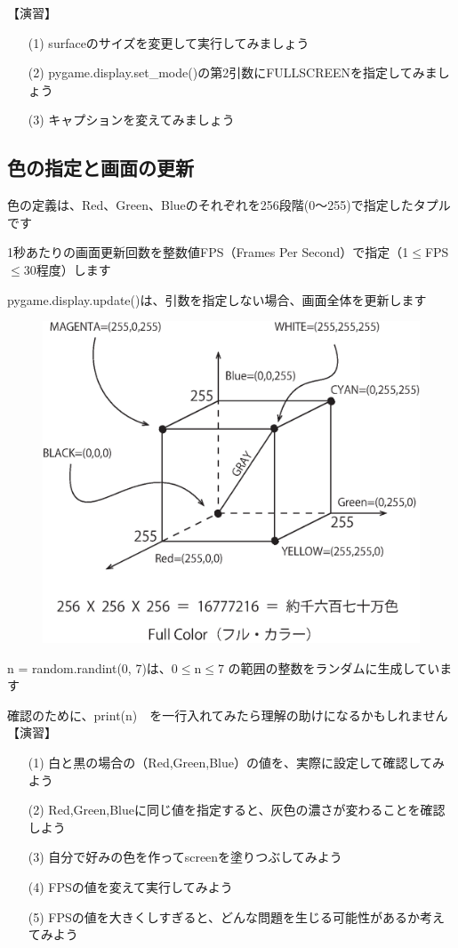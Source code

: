 \documentclass[uplatex,a4paper,11pt,oneside,openany]{jsbook}
\begin{document}

【演習】
\begin{enumerate}
\item[(1)] surfaceのサイズを変更して実行してみましょう
\item[(2)] pygame.display.set\_mode()の第2引数にFULLSCREENを指定してみましょう
\item[(3)] キャプションを変えてみましょう
\end{enumerate}

\newpage

\subsection{色の指定と画面の更新}

色の定義は、Red、Green、Blueのそれぞれを256段階(0〜255)で指定したタプルです

1秒あたりの画面更新回数を整数値FPS（Frames Per Second）で指定（1$\le$FPS$\le$30程度）します

pygame.display.update()は、引数を指定しない場合、画面全体を更新します



\begin{figure}[h]
\vspace*{-11cm}
\hspace*{7.5cm}
\includegraphics[width=0.5\hsize]{figures/eps/pg02.eps}
\label{ラベル2}
\end{figure}

\vspace{4cm}

n = random.randint(0, 7)は、0$\le$n$\le$7 の範囲の整数をランダムに生成しています

確認のために、print(n)　を一行入れてみたら理解の助けになるかもしれません\\

【演習】
\begin{enumerate}
\item[(1)] 白と黒の場合の（Red,Green,Blue）の値を、実際に設定して確認してみよう
\item[(2)] Red,Green,Blueに同じ値を指定すると、灰色の濃さが変わることを確認しよう
\item[(3)] 自分で好みの色を作ってscreenを塗りつぶしてみよう
\item[(4)] FPSの値を変えて実行してみよう
\item[(5)] FPSの値を大きくしすぎると、どんな問題を生じる可能性があるか考えてみよう
\end{enumerate}
\end{document}
